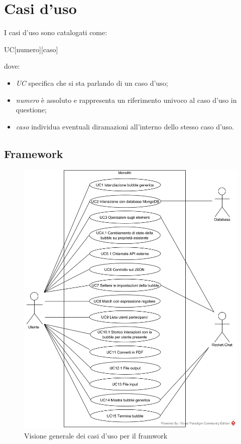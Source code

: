 \section{Casi d'uso}
I casi d'uso sono catalogati come:
\begin{center}
	UC[numero][caso]
\end{center}
dove:
\begin{itemize}
	\item \textit{UC} specifica che si sta parlando di un caso d'uso;
	\item \textit{numero} è assoluto e rappresenta un riferimento univoco al caso d'uso in questione;
	\item \textit{caso} individua eventuali diramazioni all'interno dello stesso caso d'uso.
\end{itemize}

\subsection{Framework}
\begin{figure}[H]
	\centering
	\includegraphics[width=15cm]{../../documenti/AnalisiDeiRequisiti/Diagrammi_img/usecase/framework.png}
	\caption{Visione generale dei casi d'uso per il framwork}
\end{figure}

